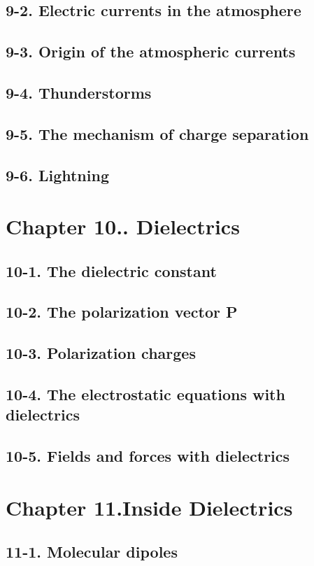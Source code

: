 \documentclass{article}
\begin{document}
\subsection{9-2. Electric currents in the atmosphere}
\subsection{9-3. Origin of the atmospheric currents}
\subsection{9-4. Thunderstorms}
\subsection{9-5. The mechanism of charge separation}
\subsection{9-6. Lightning}
\section{Chapter 10.. Dielectrics}
\subsection{10-1. The dielectric constant}
\subsection{10-2. The polarization vector P}
\subsection{10-3. Polarization charges}
\subsection{10-4. The electrostatic equations with dielectrics}
\subsection{10-5. Fields and forces with dielectrics}
\section{Chapter 11.Inside Dielectrics}
\subsection{11-1. Molecular dipoles}
\end{document}
